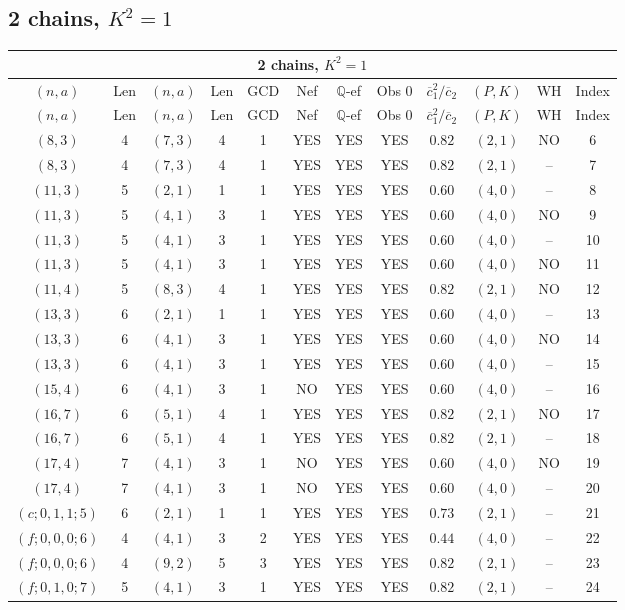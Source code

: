 \subsection{2 chains, $K^2 = 1$}
\begin{longtable}{|c|c|c|c|c|c|c|c|c|c|c|c|}
\hline
\multicolumn{12}{|c|}{2 chains, $K^2 = 1$}\\
\hline
$(n,a)$ & Len & $(n,a)$ & Len & GCD & Nef & $\mathbb Q$-ef & Obs 0 & $\overline c_1^2 / \overline c_2$ & $(P,K)$ & WH & Index\\
\hline
\endfirsthead

\hline
$(n,a)$ & Len & $(n,a)$ & Len & GCD & Nef & $\mathbb Q$-ef & Obs 0 & $\overline c_1^2 / \overline c_2$ & $(P,K)$ & WH & Index\\
\hline
\endhead
\hline
\endfoot

$(8,3)$ & 4 & $(7,3)$ & 4 & 1 & YES & YES & YES & $0.82$ & $(2,1)$ & NO & 6\\
$(8,3)$ & 4 & $(7,3)$ & 4 & 1 & YES & YES & YES & $0.82$ & $(2,1)$ & -- & 7\\
$(11,3)$ & 5 & $(2,1)$ & 1 & 1 & YES & YES & YES & $0.60$ & $(4,0)$ & -- & 8\\
$(11,3)$ & 5 & $(4,1)$ & 3 & 1 & YES & YES & YES & $0.60$ & $(4,0)$ & NO & 9\\
$(11,3)$ & 5 & $(4,1)$ & 3 & 1 & YES & YES & YES & $0.60$ & $(4,0)$ & -- & 10\\
$(11,3)$ & 5 & $(4,1)$ & 3 & 1 & YES & YES & YES & $0.60$ & $(4,0)$ & NO & 11\\
$(11,4)$ & 5 & $(8,3)$ & 4 & 1 & YES & YES & YES & $0.82$ & $(2,1)$ & NO & 12\\
$(13,3)$ & 6 & $(2,1)$ & 1 & 1 & YES & YES & YES & $0.60$ & $(4,0)$ & -- & 13\\
$(13,3)$ & 6 & $(4,1)$ & 3 & 1 & YES & YES & YES & $0.60$ & $(4,0)$ & NO & 14\\
$(13,3)$ & 6 & $(4,1)$ & 3 & 1 & YES & YES & YES & $0.60$ & $(4,0)$ & -- & 15\\
$(15,4)$ & 6 & $(4,1)$ & 3 & 1 & NO & YES & YES & $0.60$ & $(4,0)$ & -- & 16\\
$(16,7)$ & 6 & $(5,1)$ & 4 & 1 & YES & YES & YES & $0.82$ & $(2,1)$ & NO & 17\\
$(16,7)$ & 6 & $(5,1)$ & 4 & 1 & YES & YES & YES & $0.82$ & $(2,1)$ & -- & 18\\
$(17,4)$ & 7 & $(4,1)$ & 3 & 1 & NO & YES & YES & $0.60$ & $(4,0)$ & NO & 19\\
$(17,4)$ & 7 & $(4,1)$ & 3 & 1 & NO & YES & YES & $0.60$ & $(4,0)$ & -- & 20\\
$(c;0,1,1;5)$ & 6 & $(2,1)$ & 1 & 1 & YES & YES & YES & $0.73$ & $(2,1)$ & -- & 21\\
$(f;0,0,0;6)$ & 4 & $(4,1)$ & 3 & 2 & YES & YES & YES & $0.44$ & $(4,0)$ & -- & 22\\
$(f;0,0,0;6)$ & 4 & $(9,2)$ & 5 & 3 & YES & YES & YES & $0.82$ & $(2,1)$ & -- & 23\\
$(f;0,1,0;7)$ & 5 & $(4,1)$ & 3 & 1 & YES & YES & YES & $0.82$ & $(2,1)$ & -- & 24
\end{longtable}
